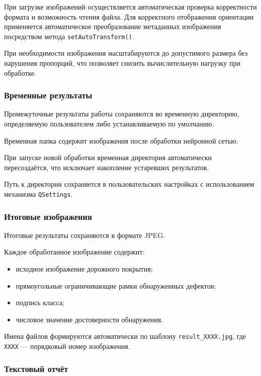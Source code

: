 При загрузке изображений осуществляется автоматическая проверка корректности формата и возможность чтения файла. Для корректного отображения ориентации применяется автоматическое преобразование метаданных изображения посредством метода \texttt{setAutoTransform()}.

При необходимости изображения масштабируются до допустимого размера без нарушения пропорций, что позволяет снизить вычислительную нагрузку при обработке.

\subsubsection{Временные результаты}

Промежуточные результаты работы сохраняются во временную директорию, определяемую пользователем либо устанавливаемую по умолчанию.

Временная папка содержит изображения после обработки нейронной сетью.

При запуске новой обработки временная директория автоматически пересоздаётся, что исключает накопление устаревших результатов.

Путь к директории сохраняется в пользовательских настройках с использованием механизма \texttt{QSettings}.

\subsubsection{Итоговые изображения}

Итоговые результаты сохраняются в формате JPEG.

Каждое обработанное изображение содержит:

\begin{itemize}
	\item исходное изображение дорожного покрытия;
	\item прямоугольные ограничивающие рамки обнаруженных дефектов;
	\item подпись класса;
	\item числовое значение достоверности обнаружения.
\end{itemize}

Имена файлов формируются автоматически по шаблону \texttt{result\_XXXX.jpg}, где \texttt{XXXX} --- порядковый номер изображения.

\subsubsection{Текстовый отчёт}

